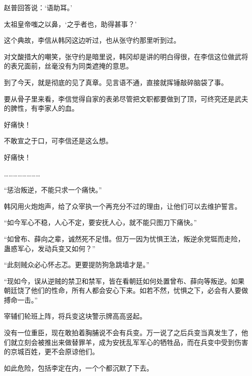 赵普回答说：‘语助耳。’

太祖皇帝嗤之以鼻，‘之乎者也，助得甚事？’

这个典故，李信从韩冈这边听过，也从张守约那里听到过。

对文酸措大的嘲笑，张守约是暗里说，韩冈却是讲的明白得很，在李信这位做武将的表兄面前，丝毫没有为同类遮掩的意思。

到了今天，就是彻底的见了真章。见言语不通，直接就挥锤敲碎脑袋了事。

要从骨子里来看，李信觉得自家的表弟尽管把文职都要做到了顶，可终究还是武夫的脾性，有李家人的血。

好痛快！

不敢宣之于口，可李信还是这么想。

好痛快！

……………………

“惩治叛逆，不能只求一个痛快。”

韩冈用火炮炮声，给了众宰执一个再充分不过的理由，让他们可以去维护誓言。

“如今军心不稳，人心不定，要安抚人心，就不能只图刀下痛快。”

“如曾布、薛向之辈，诚然死不足惜。但万一因为忧惧王法，叛逆余党铤而走险，蛊惑军心，发动兵变又如何？”

“此刻贼众必心怀忐忑。更要提防狗急跳墙才是。”

“现如今，误从逆贼的禁卫和禁军，皆在看朝廷如何处置曾布、薛向等叛逆。如果朝廷饶了他们的性命，所有人都会安心下来。如若不然，忧惧之下，必会有人要做搏命一击。”

宰辅们轮班上阵，将兵变这块警示牌高高竖起。

没有一位重臣，现在敢拍着胸脯说不会有兵变。万一说了之后兵变当真发生了，他们就立刻会被推出来做替罪羊，成为安抚乱军军心的牺牲品，而在兵变中受到伤害的京城百姓，更不会原谅他们。

如此危险，包括李定在内，一个个都沉默了下去。

